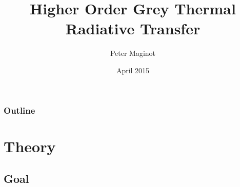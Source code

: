 \documentclass{beamer}
\title{Higher Order Grey Thermal Radiative Transfer}
\author{Peter Maginot}\institute{Texas A\&M University- Department of Nuclear Engineering}
\date{April 2015}
\newif\ifplacelogo %
\begin{document}
\placelogotrue
\begin{frame}
\titlepage


\end{frame}


\placelogofalse
\begin{frame}
\frametitle{Outline}
\tableofcontents[hideallsubsections]
\end{frame}

\section{Theory}

\subsection{Goal}
\end{document}
